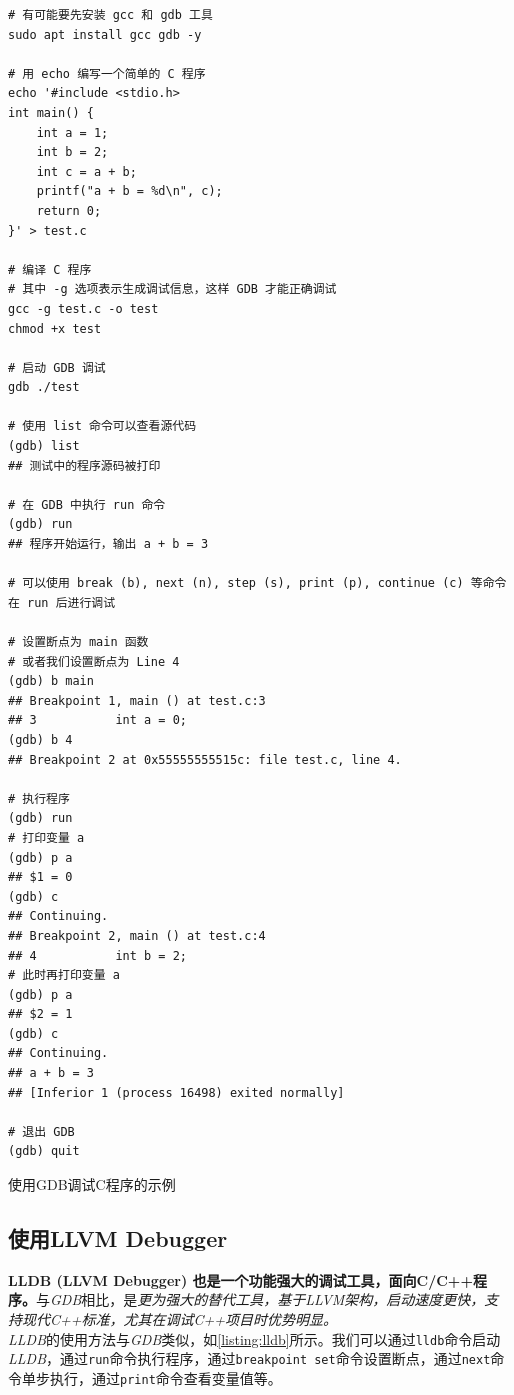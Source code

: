 \begin{longlisting}
    \begin{verbatim}
# 有可能要先安装 gcc 和 gdb 工具
sudo apt install gcc gdb -y

# 用 echo 编写一个简单的 C 程序
echo '#include <stdio.h>
int main() {
    int a = 1;
    int b = 2;
    int c = a + b;
    printf("a + b = %d\n", c);
    return 0;
}' > test.c

# 编译 C 程序
# 其中 -g 选项表示生成调试信息，这样 GDB 才能正确调试
gcc -g test.c -o test
chmod +x test

# 启动 GDB 调试
gdb ./test

# 使用 list 命令可以查看源代码
(gdb) list
## 测试中的程序源码被打印

# 在 GDB 中执行 run 命令
(gdb) run
## 程序开始运行，输出 a + b = 3

# 可以使用 break (b), next (n), step (s), print (p), continue (c) 等命令在 run 后进行调试

# 设置断点为 main 函数
# 或者我们设置断点为 Line 4
(gdb) b main
## Breakpoint 1, main () at test.c:3
## 3           int a = 0;
(gdb) b 4
## Breakpoint 2 at 0x55555555515c: file test.c, line 4.

# 执行程序
(gdb) run
# 打印变量 a
(gdb) p a
## $1 = 0
(gdb) c
## Continuing.
## Breakpoint 2, main () at test.c:4
## 4           int b = 2;
# 此时再打印变量 a
(gdb) p a
## $2 = 1
(gdb) c
## Continuing.
## a + b = 3
## [Inferior 1 (process 16498) exited normally]

# 退出 GDB
(gdb) quit
    \end{verbatim}
    \caption{使用GDB调试C程序的示例}
    \label{listing:gdb}
\end{longlisting}

\subsection{使用LLVM Debugger}

\textbf{LLDB (LLVM Debugger) 也是一个功能强大的调试工具，面向C/C++程序。}与\textit{GDB}相比，是\textit{更为强大的替代工具，基于LLVM架构，启动速度更快，支持现代C++标准，尤其在调试C++项目时优势明显。}\\

\textit{LLDB}的使用方法与\textit{GDB}类似，如\ref{listing:lldb}所示。我们可以通过\texttt{lldb}命令启动\textit{LLDB}，通过\texttt{run}命令执行程序，通过\texttt{breakpoint set}命令设置断点，通过\texttt{next}命令单步执行，通过\texttt{print}命令查看变量值等。\\

